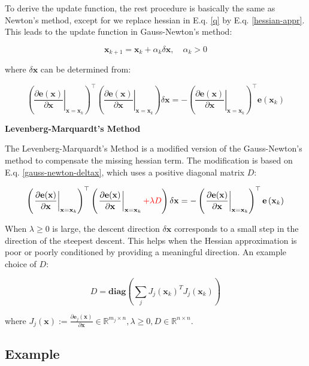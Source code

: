 To derive the update function, the rest procedure is basically the same as Newton's method, except for
we replace hessian in E.q. \ref{q} by E.q. \ref{hessian-appr}.
This leads to the update function in Gauss-Newton's method:

\begin{equation}
    \mathbf{x}_{k+1}=\mathbf{x}_k+\alpha_k \delta \mathbf{x}, \quad \alpha_k>0
\end{equation}

where $\delta \mathbf{x}$ can be determined from:

\begin{equation}
    \left(\left.\frac{\partial \mathbf{e}(\mathbf{x})}{\partial \mathbf{x}}\right|_{\mathbf{x}=\mathbf{x}_k}\right)^{\top}\left(\left.\frac{\partial \mathbf{e}(\mathbf{x})}{\partial \mathbf{x}}\right|_{\mathbf{x}=\mathbf{x}_k}\right) \delta \mathbf{x}=-\left(\left.\frac{\partial \mathbf{e}(\mathbf{x})}{\partial \mathbf{x}}\right|_{\mathbf{x}=\mathbf{x}_k}\right)^{\top} \mathbf{e}\left(\mathbf{x}_k\right)
    \label{gauss-newton-deltax}
\end{equation}

\textbf{Levenberg-Marquardt's Method}

The Levenberg-Marquardt's Method is a modified version of the Gauss-Newton's method 
to compensate the missing hessian term. The modification is based on E.q. \ref{gauss-newton-deltax},
which uses a positive diagonal matrix $D$:

\begin{equation}
    \left(\left.\frac{\partial \mathbf{e}(\mathbf{x})}{\partial \mathbf{x}}\right|_{\mathbf{x}=\mathbf{x}_k}\right)^{\top}\left(\left.\frac{\partial \mathbf{e}(\mathbf{x})}{\partial \mathbf{x}}\right|_{\mathbf{x}=\mathbf{x}_k} {\textcolor{red}{+ \lambda D}} \right) \delta \mathbf{x}=-\left(\left.\frac{\partial \mathbf{e}(\mathbf{x})}{\partial \mathbf{x}}\right|_{\mathbf{x}=\mathbf{x}_k}\right)^{\top} \mathbf{e}\left(\mathbf{x}_k\right)
\end{equation}

When $\lambda \geq 0$ is large, the descent direction $\delta \mathbf{x}$ corresponds to a small step in
the direction of the steepest descent. This helps when the Hessian approximation
is poor or poorly conditioned by providing a meaningful direction.
An example choice of $D$:

\begin{equation}
    D = \textbf{diag}(\sum_{j}{J_j(\textbf{x}_k)^T J_j(\textbf{x}_k)})
\end{equation}

where $J_j(\textbf{x}) := \frac{\partial \textbf{e}_j(\textbf{x})}{\partial \textbf{x}} 
\in \mathbb{R}^{m_j \times n}, \lambda \geq 0, D \in \mathbb{R}^{n \times n}$.

\subsection{Example}


